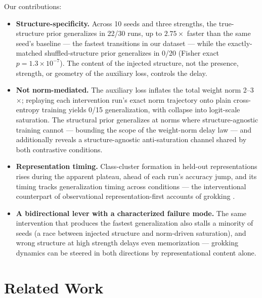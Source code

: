 \documentclass[11pt]{article}
\begin{document}
Our contributions:
\begin{itemize}
\item \textbf{Structure-specificity.} Across 10 seeds and three strengths, the true-structure
prior generalizes in 22/30 runs, up to $2.75\times$ faster than the same seed's baseline ---
the fastest transitions in our dataset --- while the exactly-matched shuffled-structure prior
generalizes in 0/20 (Fisher exact $p=1.3\times10^{-7}$). The content of the injected structure,
not the presence, strength, or geometry of the auxiliary loss, controls the delay.
\item \textbf{Not norm-mediated.} The auxiliary loss inflates the total weight norm 2--3$\times$;
replaying each intervention run's exact norm trajectory onto plain cross-entropy training yields
0/15 generalization, with collapse into logit-scale saturation. The structural prior generalizes
at norms where structure-agnostic training cannot --- bounding the scope of the weight-norm delay
law \citep{weightnormdelay2026} --- and additionally reveals a structure-agnostic anti-saturation
channel shared by both contrastive conditions.
\item \textbf{Representation timing.} Class-cluster formation in held-out representations rises
during the apparent plateau, ahead of each run's accuracy jump, and its timing tracks
generalization timing across conditions --- the interventional counterpart of observational
representation-first accounts of grokking \citep{twospeeds2026, circuitsync2026}.
\item \textbf{A bidirectional lever with a characterized failure mode.} The same intervention
that produces the fastest generalization also stalls a minority of seeds (a race between injected
structure and norm-driven saturation), and wrong structure at high strength delays even
memorization --- grokking dynamics can be steered in both directions by representational content
alone.
\end{itemize}

\section{Related Work}
\end{document}

